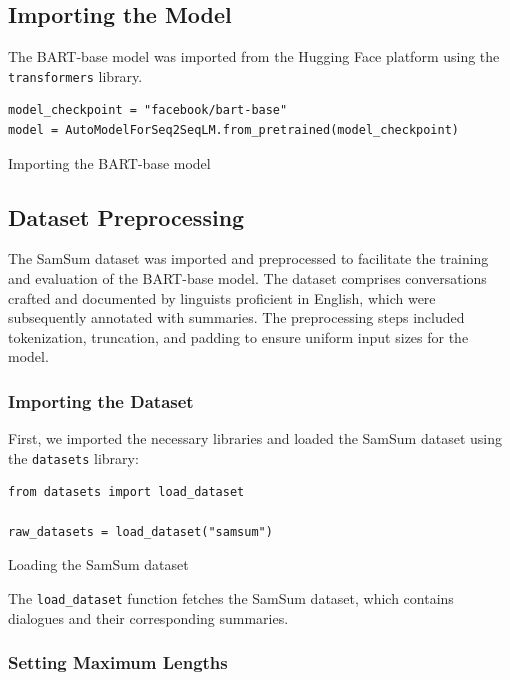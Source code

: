     \subsection{Importing the Model}
        The BART-base model was imported from the Hugging Face platform using the \texttt{transformers} library.
        \begin{listing}[H]
            \begin{verbatim}
model_checkpoint = "facebook/bart-base"
model = AutoModelForSeq2SeqLM.from_pretrained(model_checkpoint)
            \end{verbatim}
            \caption{Importing the BART-base model}
            \label{listing:Importing_BART}
        \end{listing}
    
        \subsection{Dataset Preprocessing}

The SamSum dataset was imported and preprocessed to facilitate the training and evaluation of the BART-base model. The dataset comprises conversations crafted and documented by linguists proficient in English, which were subsequently annotated with summaries. The preprocessing steps included tokenization, truncation, and padding to ensure uniform input sizes for the model.

\subsubsection{Importing the Dataset}

First, we imported the necessary libraries and loaded the SamSum dataset using the \texttt{datasets} library:

\begin{listing}[H]
\begin{verbatim}
from datasets import load_dataset

raw_datasets = load_dataset("samsum")
\end{verbatim}
\caption{Loading the SamSum dataset}
\label{listing:Loading_SamSum}
\end{listing}

The \texttt{load\_dataset} function fetches the SamSum dataset, which contains dialogues and their corresponding summaries.

\subsubsection{Setting Maximum Lengths}

